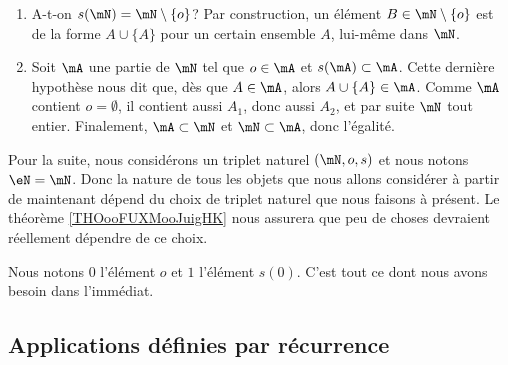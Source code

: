 \begin{normaltext}
\begin{subproof}
\begin{enumerate}
			\item A-t-on \( s( \mN ) = \mN \setminus \{ o \} \)? Par construction, un élément \( B \in  \mN \setminus \{ o \} \) est de la forme \( A \cup \{ A \} \) pour un certain ensemble \( A \), lui-même dans \( \mN \).
			\item Soit \( \mA \) une partie de \( \mN \) tel que \( o \in \mA \) et \( s(\mA) \subset \mA \). Cette dernière hypothèse nous dit que, dès que \( A \in \mA \), alors \( A \cup \{ A \} \in \mA \). Comme \( \mA \) contient \( o = \emptyset \), il contient aussi \( A_1 \), donc aussi \( A_2 \), et par suite \( \mN \) tout entier. Finalement, \( \mA \subset \mN \) et \( \mN \subset \mA \), donc l'égalité.
		\end{enumerate}
	\end{subproof}
\end{normaltext}

\begin{normaltext}[Définition de \( \eN\)]    \label{NORooDefinitionNChoixTriplet}
	Pour la suite, nous considérons un triplet naturel \( (\mN,o,s)\) et nous notons \( \eN=\mN\). Donc la nature de tous les objets que nous allons considérer à partir de maintenant dépend du choix de triplet naturel que nous faisons à présent. Le théorème \ref{THOooFUXMooJuigHK} nous assurera que peu de choses devraient réellement dépendre de ce choix.

	Nous notons \( 0\) l'élément \( o\) et \( 1\) l'élément \( s(0)\). C'est tout ce dont nous avons besoin dans l'immédiat.
\end{normaltext}

\subsection{Applications définies par récurrence}
\label{SUBooApplicationRecurrence}

